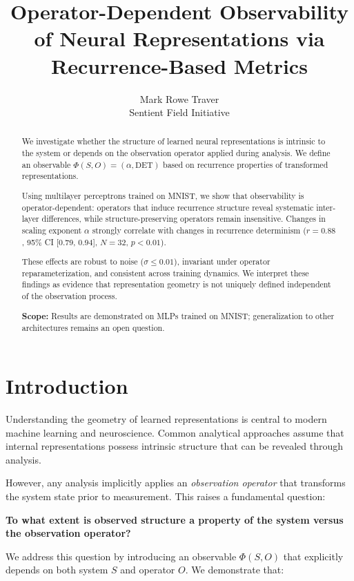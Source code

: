 \documentclass[11pt]{article}
\title{Operator-Dependent Observability of Neural Representations via Recurrence-Based Metrics}
\author{
Mark Rowe Traver \\
Sentient Field Initiative
}
\date{}
\begin{document}
\maketitle

\begin{abstract}
	We investigate whether the structure of learned neural representations is intrinsic to the system or depends on the observation operator applied during analysis. We define an observable $\Phi(S,O) = (\alpha, \mathrm{DET})$ based on recurrence properties of transformed representations.

	Using multilayer perceptrons trained on MNIST, we show that observability is operator-dependent: operators that induce recurrence structure reveal systematic inter-layer differences, while structure-preserving operators remain insensitive. Changes in scaling exponent $\alpha$ strongly correlate with changes in recurrence determinism ($r = 0.88$, 95\% CI [0.79, 0.94], $N = 32$, $p < 0.01$).

	These effects are robust to noise ($\sigma \leq 0.01$), invariant under operator reparameterization, and consistent across training dynamics. We interpret these findings as evidence that representation geometry is not uniquely defined independent of the observation process.

	\textbf{Scope:} Results are demonstrated on MLPs trained on MNIST; generalization to other architectures remains an open question.
\end{abstract}

\section{Introduction}

Understanding the geometry of learned representations is central to modern machine learning and neuroscience. Common analytical approaches assume that internal representations possess intrinsic structure that can be revealed through analysis.

However, any analysis implicitly applies an \textit{observation operator} that transforms the system state prior to measurement. This raises a fundamental question:

\textbf{To what extent is observed structure a property of the system versus the observation operator?}

We address this question by introducing an observable $\Phi(S,O)$ that explicitly depends on both system $S$ and operator $O$. We demonstrate that:
\end{document}
